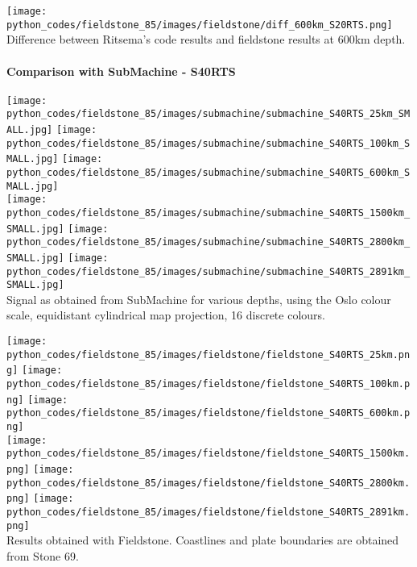 \begin{center}
\texttt{[image: python\_codes/fieldstone\_85/images/fieldstone/diff\_600km\_S20RTS.png]}\\
{\captionfont Difference between Ritsema's code results and fieldstone results at 600\si{km} depth.}
\end{center}

\newpage
\paragraph{Comparison with SubMachine - S40RTS}

\begin{center}
\texttt{[image: python\_codes/fieldstone\_85/images/submachine/submachine\_S40RTS\_25km\_SMALL.jpg]}
\texttt{[image: python\_codes/fieldstone\_85/images/submachine/submachine\_S40RTS\_100km\_SMALL.jpg]}
\texttt{[image: python\_codes/fieldstone\_85/images/submachine/submachine\_S40RTS\_600km\_SMALL.jpg]}\\
\texttt{[image: python\_codes/fieldstone\_85/images/submachine/submachine\_S40RTS\_1500km\_SMALL.jpg]}
\texttt{[image: python\_codes/fieldstone\_85/images/submachine/submachine\_S40RTS\_2800km\_SMALL.jpg]}
\texttt{[image: python\_codes/fieldstone\_85/images/submachine/submachine\_S40RTS\_2891km\_SMALL.jpg]}\\
{\captionfont Signal as obtained from SubMachine for various depths, using the Oslo colour scale, 
equidistant cylindrical map projection, 16 discrete colours.}
\end{center}

\begin{center}
\texttt{[image: python\_codes/fieldstone\_85/images/fieldstone/fieldstone\_S40RTS\_25km.png]}
\texttt{[image: python\_codes/fieldstone\_85/images/fieldstone/fieldstone\_S40RTS\_100km.png]}
\texttt{[image: python\_codes/fieldstone\_85/images/fieldstone/fieldstone\_S40RTS\_600km.png]}\\
\texttt{[image: python\_codes/fieldstone\_85/images/fieldstone/fieldstone\_S40RTS\_1500km.png]}
\texttt{[image: python\_codes/fieldstone\_85/images/fieldstone/fieldstone\_S40RTS\_2800km.png]}
\texttt{[image: python\_codes/fieldstone\_85/images/fieldstone/fieldstone\_S40RTS\_2891km.png]}\\
{\captionfont Results obtained with Fieldstone. Coastlines and plate boundaries are obtained from Stone 69.}
\end{center}

